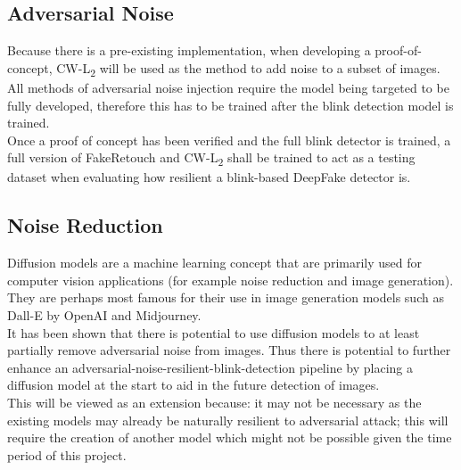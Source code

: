 \documentclass{article}
\begin{document}
\subsection{Adversarial Noise} \label{sec:future-noise}

Because there is a pre-existing implementation\cite{cwl2python}, when developing a proof-of-concept, CW-L\textsubscript{2} will be used as the method to add noise to a subset of images. All methods of adversarial noise injection require the model being targeted to be fully developed, therefore this has to be trained after the blink detection model is trained.\\

Once a proof of concept has been verified and the full blink detector is trained, a full version of FakeRetouch and CW-L\textsubscript{2} shall be trained to act as a testing dataset when evaluating how resilient a blink-based DeepFake detector is.

\subsection{Noise Reduction}

Diffusion models are a machine learning concept that are primarily used for computer vision applications (for example noise reduction and image generation)\cite{croitoru2023diffusion}. They are perhaps most famous for their use in image generation models such as Dall-E by OpenAI and Midjourney.\\

It has been shown that there is potential to use diffusion models to at least partially remove adversarial noise from images\cite{nie2022diffusion}\cite{croitoru2023diffusion}. Thus there is potential to further enhance an adversarial-noise-resilient-blink-detection pipeline by placing a diffusion model at the start to aid in the future detection of images.\\

This will be viewed as an extension because: it may not be necessary as the existing models may already be naturally resilient to adversarial attack; this will require the creation of another model which might not be possible given the time period of this project.
\end{document}
